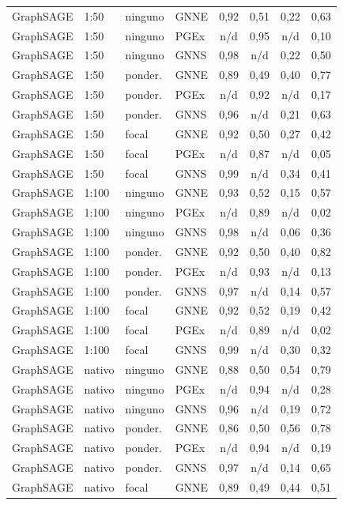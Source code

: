 \begin{longtable}{llll cccc}
GraphSAGE & 1:50 & ninguno & GNNE & 0,92 & 0,51 & 0,22 & 0,63 \\
GraphSAGE & 1:50 & ninguno & PGEx & n/d & 0,95 & n/d & 0,10 \\
GraphSAGE & 1:50 & ninguno & GNNS & 0,98 & n/d & 0,22 & 0,50 \\
GraphSAGE & 1:50 & ponder. & GNNE & 0,89 & 0,49 & 0,40 & 0,77 \\
GraphSAGE & 1:50 & ponder. & PGEx & n/d & 0,92 & n/d & 0,17 \\
GraphSAGE & 1:50 & ponder. & GNNS & 0,96 & n/d & 0,21 & 0,63 \\
GraphSAGE & 1:50 & focal & GNNE & 0,92 & 0,50 & 0,27 & 0,42 \\
GraphSAGE & 1:50 & focal & PGEx & n/d & 0,87 & n/d & 0,05 \\
GraphSAGE & 1:50 & focal & GNNS & 0,99 & n/d & 0,34 & 0,41 \\
GraphSAGE & 1:100 & ninguno & GNNE & 0,93 & 0,52 & 0,15 & 0,57 \\
GraphSAGE & 1:100 & ninguno & PGEx & n/d & 0,89 & n/d & 0,02 \\
GraphSAGE & 1:100 & ninguno & GNNS & 0,98 & n/d & 0,06 & 0,36 \\
GraphSAGE & 1:100 & ponder. & GNNE & 0,92 & 0,50 & 0,40 & 0,82 \\
GraphSAGE & 1:100 & ponder. & PGEx & n/d & 0,93 & n/d & 0,13 \\
GraphSAGE & 1:100 & ponder. & GNNS & 0,97 & n/d & 0,14 & 0,57 \\
GraphSAGE & 1:100 & focal & GNNE & 0,92 & 0,52 & 0,19 & 0,42 \\
GraphSAGE & 1:100 & focal & PGEx & n/d & 0,89 & n/d & 0,02 \\
GraphSAGE & 1:100 & focal & GNNS & 0,99 & n/d & 0,30 & 0,32 \\
GraphSAGE & nativo & ninguno & GNNE & 0,88 & 0,50 & 0,54 & 0,79 \\
GraphSAGE & nativo & ninguno & PGEx & n/d & 0,94 & n/d & 0,28 \\
GraphSAGE & nativo & ninguno & GNNS & 0,96 & n/d & 0,19 & 0,72 \\
GraphSAGE & nativo & ponder. & GNNE & 0,86 & 0,50 & 0,56 & 0,78 \\
GraphSAGE & nativo & ponder. & PGEx & n/d & 0,94 & n/d & 0,19 \\
GraphSAGE & nativo & ponder. & GNNS & 0,97 & n/d & 0,14 & 0,65 \\
GraphSAGE & nativo & focal & GNNE & 0,89 & 0,49 & 0,44 & 0,51 \\

\end{longtable}
